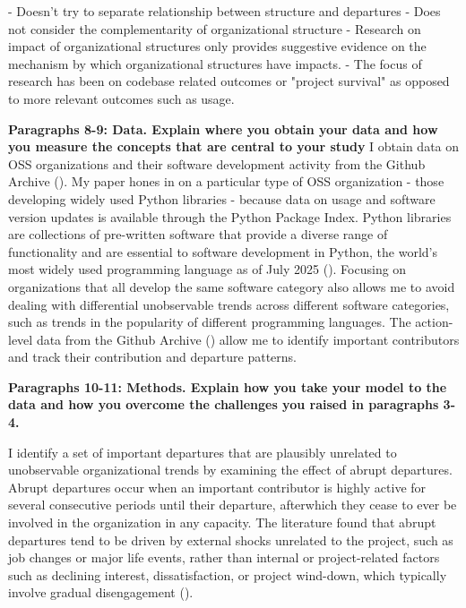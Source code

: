 \documentclass[12pt,notitlepage]{article}
\begin{document}
- Doesn't try to separate relationship between structure and departures
- Does not consider the complementarity of organizational structure 
- Research on impact of organizational structures only provides suggestive evidence on the mechanism by which organizational structures have impacts. 
- The focus of research has been on codebase related outcomes or "project survival" as opposed to more relevant outcomes such as usage. 
\fi 

\textbf{Paragraphs 8-9: Data. Explain where you obtain your data and how you measure the concepts that
are central to your study}
I obtain data on OSS organizations and their software development activity from the Github Archive (\cite{github_archive_github_2025}). My paper hones in on a particular type of OSS organization - those developing widely used Python libraries - because data on usage and software version updates is available through the Python Package Index. Python libraries are collections of pre-written software that provide a diverse range of functionality and are essential to software development in Python, the world's most widely used programming language as of July 2025 (\cite{paul_jansen_tiobe_2025}). Focusing on organizations that all develop the same software category also allows me to avoid dealing with differential unobservable trends across different software categories, such as trends in the popularity of different programming languages. The action-level data from the Github Archive (\cite{github_archive_github_2025}) allow me to identify important contributors and track their contribution and departure patterns. 


\textbf{Paragraphs 10-11: Methods. Explain how you take your model to the data and how you overcome the
challenges you raised in paragraphs 3-4.}

I identify a set of important departures that are plausibly unrelated to unobservable organizational trends by examining the effect of abrupt departures. Abrupt departures occur when an important contributor is highly active for several consecutive periods until their departure, afterwhich they cease to ever be involved in the organization in any capacity. The literature found that abrupt departures tend to be driven by external shocks unrelated to the project, such as job changes or major life events, rather than internal or project-related factors such as declining interest, dissatisfaction, or project wind-down, which typically involve gradual disengagement (\cite{miller_why_2019}). 
\end{document}
